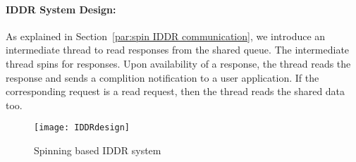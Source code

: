 \paragraph{IDDR System Design:}
As explained in Section~\ref{par:spin IDDR communication}, we introduce an intermediate thread to read responses from the shared queue. The intermediate thread spins for responses. Upon availability of a response, the thread reads the response and sends a complition notification to a user application. If the corresponding request is a read request, then the thread reads the shared data too.

\begin{figure}[!ht]
\centering
\texttt{[image: IDDRdesign]}
\caption{Spinning based IDDR system}
\label{fig:new IDDR system}
\end{figure}

    
